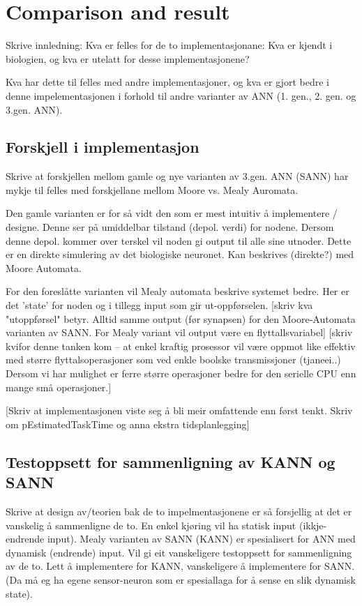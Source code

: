 
\chapter{Comparison and result} 

Skrive innledning: Kva er felles for de to implementasjonane: Kva er kjendt i biologien, og kva er utelatt for desse implementasjonene?

Kva har dette til felles med andre implementasjoner, og kva er gjort bedre i denne impelementasjonen i forhold til andre varianter av ANN (1. gen., 2. gen. og 3.gen. ANN).

\section{Forskjell i implementasjon}
Skrive at forskjellen mellom gamle og nye varianten av 3.gen. ANN (SANN) har mykje til felles med forskjellane mellom Moore vs. Mealy Auromata.

Den gamle varianten er for så vidt den som er mest intuitiv å implementere / designe. Denne ser på umiddelbar tilstand (depol. verdi) for nodene. Dersom denne depol. kommer over terskel vil noden gi output til alle sine utnoder.
Dette er en direkte simulering av det biologiske neuronet. Kan beskrives (direkte?) med Moore Automata.

For den foreslåtte varianten vil Mealy automata beskrive systemet bedre. Her er det 'state' for noden og i tillegg input som gir ut-oppførselen.
[skriv kva "utoppførsel" betyr. Alltid samme output (før synapsen) for den Moore-Automata varianten av SANN. For Mealy variant vil output være en flyttallsvariabel]
[skriv kvifor denne tanken kom -- at enkel kraftig prosessor vil være oppmot like effektiv med større flyttalsoperasjoner som ved enkle boolske transmissjoner (tjaneei..)
Dersom vi har mulighet er ferre større operasjoner bedre for den serielle CPU enn mange små operasjoner.]

[Skriv at implementasjonen viste seg å bli meir omfattende enn først tenkt. Skriv om pEstimatedTaskTime og anna ekstra tidsplanlegging]




\section{Testoppsett for sammenligning av KANN og SANN}
Skrive at design av/teorien bak  de to impelmentasjonene er så forsjellig at det er vanskelig å sammenligne de to. En enkel kjøring vil ha statisk input (ikkje-endrende input).
Mealy varianten av SANN (KANN) er spesialisert for ANN med dynamisk (endrende) input. Vil gi eit vanskeligere testoppsett for sammenligning av de to. Lett å implementere for KANN, vanskeligere å implementere for SANN.
(Da må eg ha egene sensor-neuron som er spesiallaga for å sense en slik dynamisk state).

